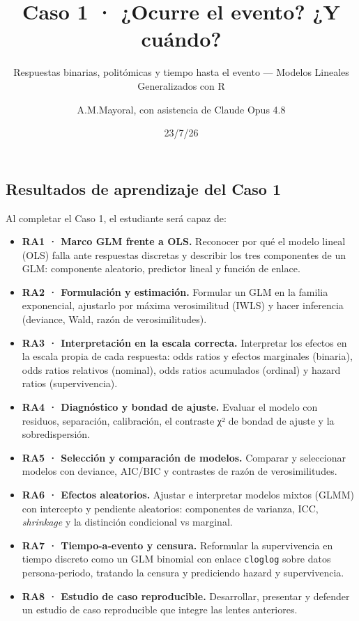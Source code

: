 \documentclass[
  letterpaper,
  DIV=11,
  numbers=noendperiod]{scrartcl}
\title{Caso 1 · ¿Ocurre el evento? ¿Y cuándo?}
\subtitle{Respuestas binarias, politómicas y tiempo hasta el evento ---
Modelos Lineales Generalizados con R}
\author{A.M.Mayoral, con asistencia de Claude Opus 4.8}
\date{23/7/26}
\providecommand{\tightlist}{%
  \setlength{\itemsep}{0pt}\setlength{\parskip}{0pt}}\usepackage{longtable,booktabs,array}
\renewcommand*\contentsname{Tabla de contenidos}
\newcommand\contentsname{Tabla de contenidos}
\begin{document}
\maketitle
\ifdefined\Shaded\renewenvironment{Shaded}{\begin{tcolorbox}[interior hidden, enhanced, sharp corners, boxrule=0pt, borderline west={3pt}{0pt}{shadecolor}, frame hidden, breakable]}{\end{tcolorbox}}\fi

\renewcommand*\contentsname{Tabla de contenidos}
{
\hypersetup{linkcolor=}
\setcounter{tocdepth}{3}
\tableofcontents
}
\hypertarget{sec-ra}{%
\subsection{Resultados de aprendizaje del Caso 1}\label{sec-ra}}

Al completar el Caso 1, el estudiante será capaz de:

\begin{itemize}
\tightlist
\item
  \textbf{RA1 · Marco GLM frente a OLS.} Reconocer por qué el modelo
  lineal (OLS) falla ante respuestas discretas y describir los tres
  componentes de un GLM: componente aleatorio, predictor lineal y
  función de enlace.
\item
  \textbf{RA2 · Formulación y estimación.} Formular un GLM en la familia
  exponencial, ajustarlo por máxima verosimilitud (IWLS) y hacer
  inferencia (deviance, Wald, razón de verosimilitudes).
\item
  \textbf{RA3 · Interpretación en la escala correcta.} Interpretar los
  efectos en la escala propia de cada respuesta: odds ratios y efectos
  marginales (binaria), odds ratios relativos (nominal), odds ratios
  acumulados (ordinal) y hazard ratios (supervivencia).
\item
  \textbf{RA4 · Diagnóstico y bondad de ajuste.} Evaluar el modelo con
  residuos, separación, calibración, el contraste χ² de bondad de ajuste
  y la sobredispersión.
\item
  \textbf{RA5 · Selección y comparación de modelos.} Comparar y
  seleccionar modelos con deviance, AIC/BIC y contrastes de razón de
  verosimilitudes.
\item
  \textbf{RA6 · Efectos aleatorios.} Ajustar e interpretar modelos
  mixtos (GLMM) con intercepto y pendiente aleatorios: componentes de
  varianza, ICC, \emph{shrinkage} y la distinción condicional vs
  marginal.
\item
  \textbf{RA7 · Tiempo-a-evento y censura.} Reformular la supervivencia
  en tiempo discreto como un GLM binomial con enlace \texttt{cloglog}
  sobre datos persona-periodo, tratando la censura y prediciendo hazard
  y supervivencia.
\item
  \textbf{RA8 · Estudio de caso reproducible.} Desarrollar, presentar y
  defender un estudio de caso reproducible que integre las lentes
  anteriores.
\end{itemize}
\end{document}
